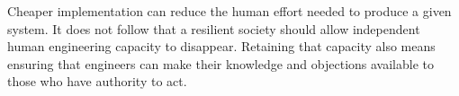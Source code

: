 
Cheaper implementation can reduce the human effort needed to produce a given system. It does not follow that a resilient society should allow independent human engineering capacity to disappear. Retaining that capacity also means ensuring that engineers can make their knowledge and objections available to those who have authority to act.





